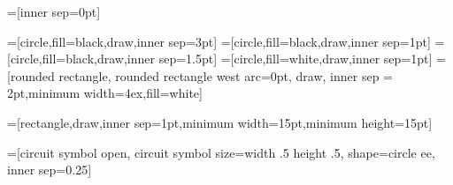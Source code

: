 
\usetikzlibrary{backgrounds,circuits,circuits.ee.IEC,shapes,fit,matrix,automata,decorations.markings}
\UseTwocells


  \tikzset{font=\footnotesize}
  =[inner sep=0pt]

=[circle,fill=black,draw,inner sep=3pt]
=[circle,fill=black,draw,inner sep=1pt]
=[circle,fill=black,draw,inner sep=1.5pt]
=[circle,fill=white,draw,inner sep=1pt]
=[rounded rectangle, rounded rectangle west arc=0pt, draw, inner
sep = 2pt,minimum width=4ex,fill=white]

=[rectangle,draw,inner sep=1pt,minimum width=15pt,minimum height=15pt]
  

  =[circuit symbol open,
    circuit symbol size=width .5 height .5,
    shape=circle ee,
  inner sep=0.25\pgflinewidth]

\newcommand{\mult}[1]
{
\begin{aligned}
    \resizebox{#1}{!}{
\begin{tikzpicture}
	\begin{pgfonlayer}{nodelayer}
		\node [style=none] (0) at (1, -0) {};
		\node [style=circ] (1) at (0.125, -0) {};
		\node [style=none] (2) at (-1, 0.5) {};
		\node [style=none] (3) at (-1, -0.5) {};
	\end{pgfonlayer}
	\begin{pgfonlayer}{edgelayer}
		\draw[line width=2pt] (0.center) to (1.center);
		\draw[line width=2pt] [in=0, out=120, looseness=1.20] (1.center) to (2.center);
		\draw[line width=2pt] [in=0, out=-120, looseness=1.20] (1.center) to (3.center);
	\end{pgfonlayer}
      \end{tikzpicture}}
\end{aligned}
}

\newcommand{\unit}[1]
{
  \begin{aligned}
    \resizebox{#1}{!}{
\begin{tikzpicture}
	\begin{pgfonlayer}{nodelayer}
		\node [style=none] (0) at (1, -0) {};
		\node [style=none] (1) at (-1, -0) {};
		\node [style=circ] (2) at (0, -0) {};
	\end{pgfonlayer}
	\begin{pgfonlayer}{edgelayer}
		\draw[line width=2pt] (0.center) to (2);
	\end{pgfonlayer}
      \end{tikzpicture}}
  \end{aligned}
}

